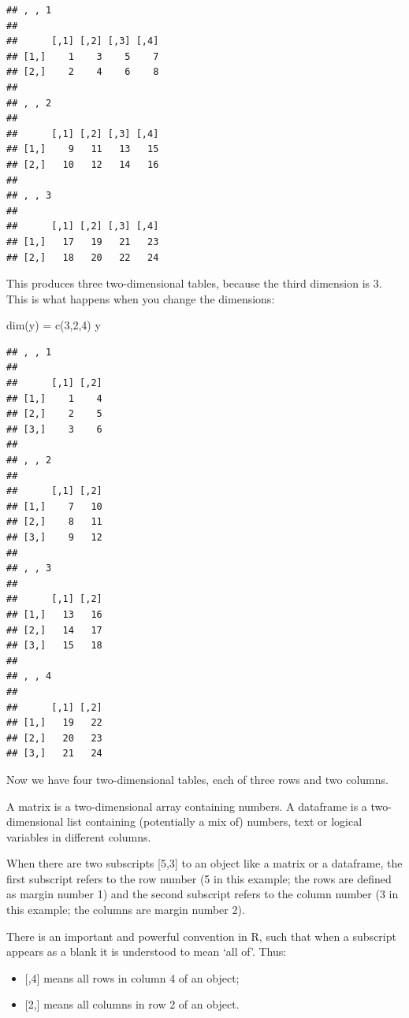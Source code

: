 \documentclass[
]{book}
\newenvironment{Shaded}{\begin{snugshade}}{\end{snugshade}}
\newcommand{\DecValTok}[1]{\textcolor[rgb]{0.00,0.00,0.81}{#1}}
\newcommand{\FunctionTok}[1]{\textcolor[rgb]{0.00,0.00,0.00}{#1}}
\newcommand{\NormalTok}[1]{#1}
\newcommand{\OtherTok}[1]{\textcolor[rgb]{0.56,0.35,0.01}{#1}}
\providecommand{\tightlist}{%
  \setlength{\itemsep}{0pt}\setlength{\parskip}{0pt}}
\begin{document}
\begin{verbatim}
## , , 1
## 
##      [,1] [,2] [,3] [,4]
## [1,]    1    3    5    7
## [2,]    2    4    6    8
## 
## , , 2
## 
##      [,1] [,2] [,3] [,4]
## [1,]    9   11   13   15
## [2,]   10   12   14   16
## 
## , , 3
## 
##      [,1] [,2] [,3] [,4]
## [1,]   17   19   21   23
## [2,]   18   20   22   24
\end{verbatim}

This produces three two-dimensional tables, because the third dimension is 3. This is what happens when you change the dimensions:

\begin{Shaded}
\begin{Highlighting}[]
\FunctionTok{dim}\NormalTok{(y) }\OtherTok{=} \FunctionTok{c}\NormalTok{(}\DecValTok{3}\NormalTok{,}\DecValTok{2}\NormalTok{,}\DecValTok{4}\NormalTok{)}
\NormalTok{y}
\end{Highlighting}
\end{Shaded}

\begin{verbatim}
## , , 1
## 
##      [,1] [,2]
## [1,]    1    4
## [2,]    2    5
## [3,]    3    6
## 
## , , 2
## 
##      [,1] [,2]
## [1,]    7   10
## [2,]    8   11
## [3,]    9   12
## 
## , , 3
## 
##      [,1] [,2]
## [1,]   13   16
## [2,]   14   17
## [3,]   15   18
## 
## , , 4
## 
##      [,1] [,2]
## [1,]   19   22
## [2,]   20   23
## [3,]   21   24
\end{verbatim}

Now we have four two-dimensional tables, each of three rows and two columns.

A matrix is a two-dimensional array containing numbers. A dataframe is a two-dimensional list containing (potentially a mix of) numbers, text or logical variables in different columns.

When there are two subscripts {[}5,3{]} to an object like a matrix or a dataframe, the first subscript refers to the row number (5 in this example; the rows are defined as margin number 1) and the second subscript refers to the column number (3 in this example; the columns are margin number 2).

There is an important and powerful convention in R, such that when a subscript appears as a blank it is understood to mean `all of'. Thus:

\begin{itemize}
\tightlist
\item
  {[},4{]} means all rows in column 4 of an object;
\item
  {[}2,{]} means all columns in row 2 of an object.
\end{itemize}
\end{document}

